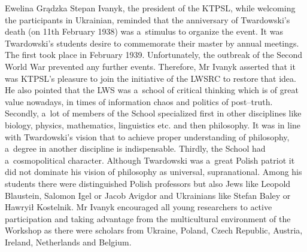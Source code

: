 \begin{editorialeng}{Ewelina Grądzka}
Stepan Ivanyk, the president of the KTPSL, while welcoming the participants in Ukrainian, reminded that the anniversary of Twardowski’s death (on 11th February 1938) was a~stimulus to organize the event. It was Twardowski’s students desire to commemorate their master by annual meetings. The first took place in February 1939. Unfortunately, the outbreak of the Second World War prevented any further events. Therefore, Mr Ivanyk asserted that it was KTPSL’s pleasure to join the initiative of the LWSRC to restore that idea. He also pointed that the LWS was a~school of critical thinking which is of great value nowadays, in times of information chaos and politics of post--truth. Secondly, a~lot of members of the School specialized first in other disciplines like biology, physics, mathematics, linguistics etc. and then philosophy. It was in line with Twardowski’s vision that to achieve proper understanding of philosophy, a~degree in another discipline is indispensable. Thirdly, the School had a~cosmopolitical character. Although Twardowski was a~great Polish patriot it did not dominate his vision of philosophy as universal, supranational. Among his students there were distinguished Polish professors but also Jews like Leopold Blaustein, Salomon Igel or Jacob Avigdor and Ukrainians like Stefan Baley or Hawryił Kostelnik. Mr Ivanyk encouraged all young researchers to active participation and taking advantage from the multicultural environment of the Workshop as there were scholars from Ukraine, Poland, Czech Republic, Austria, Ireland, Netherlands and Belgium.


\end{editorialeng}
